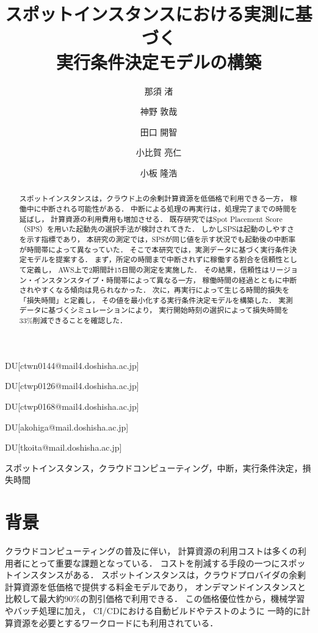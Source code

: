 \documentclass[submit,techrep,noauthor]{ipsj}
\begin{document}
\title{スポットインスタンスにおける実測に基づく\\実行条件決定モデルの構築}



\author{那須 渚}{}{DU}[ctwn0144@mail4.doshisha.ac.jp]
\author{神野 敦哉}{}{DU}[ctwp0126@mail4.doshisha.ac.jp]
\author{田口 開智}{}{DU}[ctwp0168@mail4.doshisha.ac.jp]
\author{小比賀 亮仁}{}{DU}[akohiga@mail.doshisha.ac.jp]
\author{小板 隆浩}{}{DU}[tkoita@mail.doshisha.ac.jp]

\begin{abstract}
スポットインスタンスは，クラウド上の余剰計算資源を低価格で利用できる一方，
稼働中に中断される可能性がある．
中断による処理の再実行は，処理完了までの時間を延ばし，
計算資源の利用費用も増加させる．
既存研究ではSpot Placement Score（SPS）を用いた起動先の選択手法が検討されてきた．
しかしSPSは起動のしやすさを示す指標であり，
本研究の測定では，SPSが同じ値を示す状況でも起動後の中断率が時間帯によって異なっていた．
そこで本研究では，実測データに基づく実行条件決定モデルを提案する．
まず，所定の時間まで中断されずに稼働する割合を信頼性として定義し，
AWS上で2期間計15日間の測定を実施した．
その結果，信頼性はリージョン・インスタンスタイプ・時間帯によって異なる一方，
稼働時間の経過とともに中断されやすくなる傾向は見られなかった．
次に，再実行によって生じる時間的損失を「損失時間」と定義し，
その値を最小化する実行条件決定モデルを構築した．
実測データに基づくシミュレーションにより，
実行開始時刻の選択によって損失時間を33\%削減できることを確認した．
\end{abstract}


\begin{jkeyword}
スポットインスタンス，クラウドコンピューティング，中断，実行条件決定，損失時間
\end{jkeyword}



\maketitle

\section{背景}
\label{sec:background}

クラウドコンピューティングの普及に伴い，
計算資源の利用コストは多くの利用者にとって重要な課題となっている．
コストを削減する手段の一つにスポットインスタンスがある\cite{AWSSpot}．
スポットインスタンスは，クラウドプロバイダの余剰計算資源を低価格で提供する料金モデルであり，
オンデマンドインスタンスと比較して最大約90\%の割引価格で利用できる．
この価格優位性から，機械学習やバッチ処理に加え，
CI/CDにおける自動ビルドやテストのように
一時的に計算資源を必要とするワークロードにも利用されている\cite{Ramesh2025}．
\end{document}
